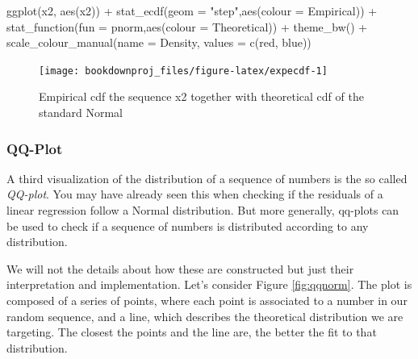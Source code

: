 \documentclass[
]{book}
\newenvironment{Shaded}{\begin{snugshade}}{\end{snugshade}}
\newcommand{\AttributeTok}[1]{\textcolor[rgb]{0.77,0.63,0.00}{#1}}
\newcommand{\FunctionTok}[1]{\textcolor[rgb]{0.00,0.00,0.00}{#1}}
\newcommand{\NormalTok}[1]{#1}
\newcommand{\SpecialCharTok}[1]{\textcolor[rgb]{0.00,0.00,0.00}{#1}}
\newcommand{\StringTok}[1]{\textcolor[rgb]{0.31,0.60,0.02}{#1}}
\begin{document}
\begin{Shaded}
\begin{Highlighting}[]
\FunctionTok{ggplot}\NormalTok{(x2, }\FunctionTok{aes}\NormalTok{(x2)) }\SpecialCharTok{+}
   \FunctionTok{stat\_ecdf}\NormalTok{(}\AttributeTok{geom =} \StringTok{"step"}\NormalTok{,}\FunctionTok{aes}\NormalTok{(}\AttributeTok{colour =} \StringTok{\textquotesingle{}Empirical\textquotesingle{}}\NormalTok{)) }\SpecialCharTok{+}
   \FunctionTok{stat\_function}\NormalTok{(}\AttributeTok{fun =}\NormalTok{ pnorm,}\FunctionTok{aes}\NormalTok{(}\AttributeTok{colour =} \StringTok{\textquotesingle{}Theoretical\textquotesingle{}}\NormalTok{)) }\SpecialCharTok{+}
   \FunctionTok{theme\_bw}\NormalTok{() }\SpecialCharTok{+}      
   \FunctionTok{scale\_colour\_manual}\NormalTok{(}\AttributeTok{name =} \StringTok{\textquotesingle{}Density\textquotesingle{}}\NormalTok{, }\AttributeTok{values =} \FunctionTok{c}\NormalTok{(}\StringTok{\textquotesingle{}red\textquotesingle{}}\NormalTok{, }\StringTok{\textquotesingle{}blue\textquotesingle{}}\NormalTok{))}
\end{Highlighting}
\end{Shaded}

\begin{figure}

{\centering \texttt{[image: bookdownproj\_files/figure-latex/expecdf-1]} 

}

\caption{Empirical cdf the sequence x2 together with theoretical cdf of the standard Normal}\label{fig:expecdf}
\end{figure}

\hypertarget{qq-plot}{%
\subsubsection{QQ-Plot}\label{qq-plot}}

A third visualization of the distribution of a sequence of numbers is the so called \emph{QQ-plot}. You may have already seen this when checking if the residuals of a linear regression follow a Normal distribution. But more generally, qq-plots can be used to check if a sequence of numbers is distributed according to any distribution.

We will not the details about how these are constructed but just their interpretation and implementation. Let's consider Figure \ref{fig:qqnorm}. The plot is composed of a series of points, where each point is associated to a number in our random sequence, and a line, which describes the theoretical distribution we are targeting. The closest the points and the line are, the better the fit to that distribution.
\end{document}
